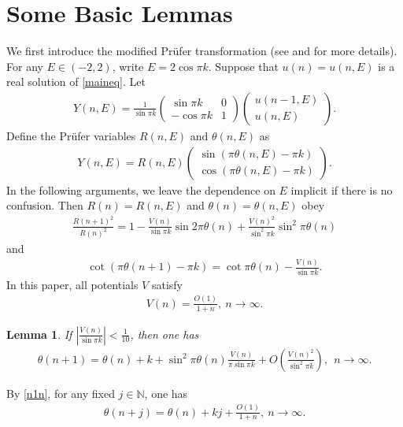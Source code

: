 \documentclass[12pt]{amsart}
\newcommand{\abs}[1]{\left\lvert #1 \right\rvert}
\theoremstyle{plain}
\newtheorem{lemma}[theorem]{Lemma}
\theoremstyle{definition}
\begin{document}
	\section{Some Basic Lemmas}\label{sec2}
	
	 
	
	We first introduce the modified Pr\"ufer transformation (see \cite{KiselevLastSimonPruefer} and \cite{RemlingCMP} for more details). For any $E\in (-2,2)$, write $E=2\cos \pi k$. Suppose that $u(n)=u(n,E)$ is a real solution of \eqref{maineq}. Let
	\begin{align}
		Y(n,E)=\frac{1}{\sin\pi k}\begin{pmatrix}
			\sin \pi k &  0\\
			-\cos \pi k & 1
		\end{pmatrix}
		\begin{pmatrix}
			u(n-1,E)\\
			u(n,E)
		\end{pmatrix}.\label{yne}
	\end{align}
	Define the Pr\"ufer variables $R(n,E)$ and $\theta(n,E)$ as 
	\begin{align}
		Y(n,E)=R(n,E)\begin{pmatrix}
			\sin (\pi\theta(n,E)-\pi k)\\
			\cos (\pi\theta(n,E)-\pi k)
		\end{pmatrix}.\label{rne}
	\end{align}
In the following arguments, we leave the dependence on $E$ implicit if there is no confusion.	Then $R(n)=R(n,E)$ and $\theta(n)=\theta(n,E)$ obey
	\begin{eqnarray}\label{lr}
		\frac{R(n+1)^2}{ R(n)^2}=1-\frac{V(n)}{\sin\pi k}\sin2\pi\theta(n)+\frac{V(n)^2}{\sin^2\pi k}\sin^2\pi\theta(n)
	\end{eqnarray}
	and
	\begin{eqnarray}\label{ctt}
		\cot (\pi \theta(n+1)-\pi k)=\cot \pi \theta(n)-\frac{V(n)}{\sin\pi k}.
	\end{eqnarray}
In this paper, all potentials $V$ satisfy
\begin{align}
	V(n)=\frac{O(1)}{1+n},\ n\to\infty.\label{vno1}
\end{align}



{\begin{lemma}\cite[Lemma 2.2]{LiuLyuResonant}\label{nn}
	If $\abs{\frac{V(n)}{\sin\pi k}}<\frac{1}{10}$, then one has
	\begin{eqnarray}\label{n1n}
		\theta(n+1)=\theta(n)+k+\sin^2\pi\theta(n)\frac{V(n)}{\pi\sin\pi k}+O\left(\frac{V(n)^2}{\sin^2\pi k}\right),\ \ n\to\infty.
	\end{eqnarray}
	 
\end{lemma}}
By \eqref{n1n}, for any fixed $j\in\mathbb{N}$, one has
\begin{eqnarray}\label{bhgx}
	\theta(n+j)=\theta(n)+kj+\frac{O(1)}{1+n},\ n\to\infty.\label{thetan+jn}
\end{eqnarray}
\end{document}
